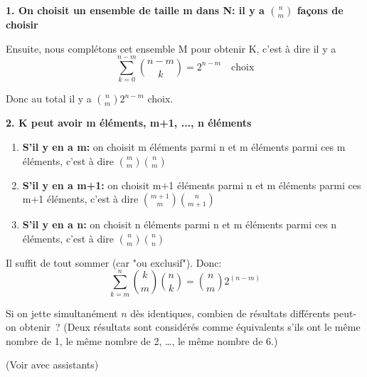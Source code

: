 \vspace{1cm}

\textbf{1. On choisit un ensemble de taille m dans N: il y a ${n \choose m}$ façons de choisir}

Ensuite, nous complétons cet ensemble M pour obtenir K, c'est à dire il y a $$\sum_{k=0}^{n-m} {n-m \choose k} = 2^{n-m} \quad \text{choix}$$ 

Donc au total il y a ${n \choose m} 2^{n-m}$ choix.

\textbf{2. K peut avoir m éléments, m+1, ..., n éléments} 

\begin{enumerate}
\item \textbf{S'il y en a m:} on choisit m éléments parmi n et m éléments parmi ces m éléments, c'est à dire ${m \choose m}{n \choose m}$
\item \textbf{S'il y en a m+1:} on choisit m+1 éléments parmi n et m éléments parmi ces m+1 éléments, c'est à dire ${m+1 \choose m}{n \choose m+1}$
\item \textbf{S'il y en a n:} on choisit n éléments parmi n et m éléments parmi ces n éléments, c'est à dire ${n \choose m}{n \choose n}$ 
\end{enumerate}

Il suffit de tout sommer (car "ou exclusif"). Donc: \[ \sum_{k=m}^n {k \choose m}{n \choose k} = {n \choose m} 2^{(n-m)}\]

\vspace{1cm}


\begin{exo} 
Si on jette simultan\'ement $n$ d\`es identiques, combien de r\'esultats diff\'erents peut-on obtenir~? (Deux r\'esultats sont consid\'er\'es comme \'equivalents s'ils ont le m\^eme nombre de 1, le m\^eme nombre de 2, \ldots, le m\^eme nombre de 6.)
\end{exo}

(Voir avec assistants)